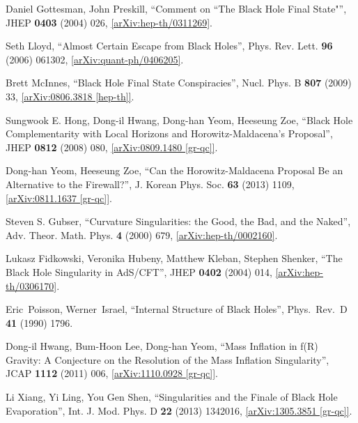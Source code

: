\documentclass[12pt]{article}
\newcommand{\2}{$^2$}
\newcommand{\3}{$^3$}
\newcommand{\4}{$_4$}
\newcommand{\5}{$_5$}
\begin{document}
\begin{thebibliography}{400}
Daniel Gottesman, John Preskill, ``Comment on ``The Black Hole Final State"'', JHEP \textbf{0403} (2004) 026, \href{http://arxiv.org/abs/hep-th/0311269}{[arXiv:hep-th/0311269]}.

Seth Lloyd, ``Almost Certain Escape from Black Holes'', Phys. Rev. Lett. \textbf{96} (2006) 061302, \href{http://arxiv.org/abs/quant-ph/0406205}{[arXiv:quant-ph/0406205]}.

Brett McInnes, ``Black Hole Final State Conspiracies'', Nucl. Phys. B \textbf{807} (2009) 33, \href{http://arxiv.org/abs/0806.3818}{[arXiv:0806.3818 [hep-th]]}.

Sungwook E. Hong, Dong-il Hwang, Dong-han Yeom, Heeseung Zoe, ``Black Hole Complementarity with Local Horizons and Horowitz-Maldacena's Proposal'', JHEP \textbf{0812} (2008) 080, \href{http://arxiv.org/abs/0809.1480}{[arXiv:0809.1480 [gr-qc]]}. 

Dong-han Yeom, Heeseung Zoe,
``Can the Horowitz-Maldacena Proposal Be an Alternative to the Firewall?'', J. Korean Phys. Soc. \textbf{63} (2013) 1109, \href{http://arxiv.org/abs/0811.1637}{[arXiv:0811.1637 [gr-qc]]}.

Steven S. Gubser, ``Curvature Singularities: the Good, the Bad, and the Naked'', Adv. Theor. Math. Phys. \textbf{4} (2000) 679, \href{http://arxiv.org/abs/hep-th/0002160}{[arXiv:hep-th/0002160]}.

Lukasz Fidkowski, Veronika Hubeny, Matthew Kleban, Stephen Shenker, ``The Black Hole Singularity in AdS/CFT'',
JHEP \textbf{0402} (2004) 014, \href{http://arxiv.org/abs/hep-th/0306170}{[arXiv:hep-th/0306170]}.


  Eric~Poisson, Werner~Israel,
  ``Internal Structure of Black Holes'', Phys.\ Rev.\ D {\bf 41} (1990) 1796.
	


Dong-il Hwang, Bum-Hoon Lee, Dong-han Yeom,
  ``Mass Inflation in f(R) Gravity: A Conjecture on the Resolution of the Mass Inflation Singularity'',
  JCAP {\bf 1112} (2011) 006,
	\href{http://arxiv.org/abs/1110.0928}{[arXiv:1110.0928 [gr-qc]]}.
	
Li Xiang, Yi Ling, You Gen Shen, ``Singularities and the Finale of Black Hole Evaporation'', Int. J. Mod. Phys. D \textbf{22} (2013) 1342016, \href{http://arxiv.org/abs/1305.3851}{[arXiv:1305.3851 [gr-qc]]}.
	

\end{thebibliography}
\end{document}

